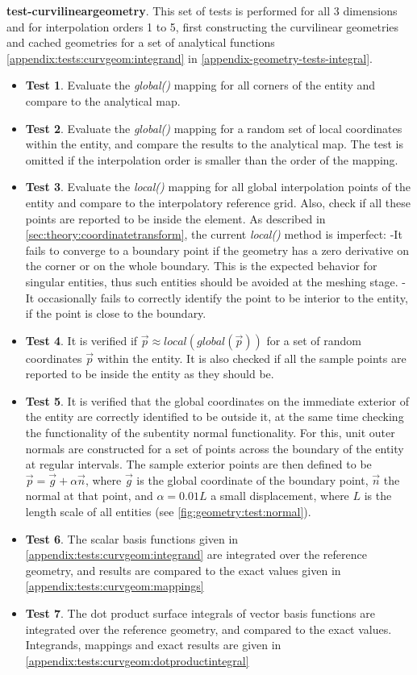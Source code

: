 \noindent
\textbf{test-curvilineargeometry}. This set of tests is performed for all 3 dimensions and for interpolation orders 1 to 5, first constructing the curvilinear geometries and cached geometries for a set of analytical functions \cref{appendix:tests:curvgeom:integrand} in \cref{appendix-geometry-tests-integral}.
\begin{itemize}
	\item \textbf{Test 1}. Evaluate the \textit{global()} mapping for all corners of the entity and compare to the analytical map.
	\item \textbf{Test 2}. Evaluate the \textit{global()} mapping for a random set of local coordinates within the entity, and compare the results to the analytical map. The test is omitted if the interpolation order is smaller than the order of the mapping.
	\item \textbf{Test 3}. Evaluate the \textit{local()} mapping for all global interpolation points of the entity and compare to the interpolatory reference grid. Also, check if all these points are reported to be inside the element. As described in \cref{sec:theory:coordinatetransform}, the current \textit{local()} method is imperfect:
		\subitem -It fails to converge to a boundary point if the geometry has a zero derivative on the corner or on the whole boundary. This is the expected behavior for singular entities, thus such entities should be avoided at the meshing stage.
		\subitem -It occasionally fails to correctly identify the point to be interior to the entity, if the point is close to the boundary.
	\item \textbf{Test 4}. It is verified if $\vec{p} \approx local(global(\vec{p}))$ for a set of random coordinates $\vec{p}$ within the entity. It is also checked if all the sample points are reported to be inside the entity as they should be.
	\item \textbf{Test 5}. It is verified that the global coordinates on the immediate exterior of the entity are correctly identified to be outside it, at the same time checking the functionality of the subentity normal functionality. For this, unit outer normals are constructed for a set of points across the boundary of the entity at regular intervals. The sample exterior points are then defined to be $\vec{p} = \vec{g} + \alpha \vec{n}$, where $\vec{g}$ is the global coordinate of the boundary point, $\vec{n}$ the normal at that point, and $\alpha = 0.01 L$ a small displacement, where $L$ is the length scale of all entities (see \cref{fig:geometry:test:normal}).
	\item \textbf{Test 6}. The scalar basis functions given in \cref{appendix:tests:curvgeom:integrand} are integrated over the reference geometry, and results are compared to the exact values given in \cref{appendix:tests:curvgeom:mappings}
	\item \textbf{Test 7}. The dot product surface integrals of vector basis functions are integrated over the reference geometry, and compared to  the exact values. Integrands, mappings and exact results are given in \cref{appendix:tests:curvgeom:dotproductintegral}
\end{itemize}

